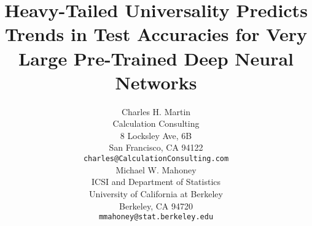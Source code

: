 \documentclass{article}
\title{Heavy-Tailed Universality Predicts Trends in Test Accuracies for Very Large Pre-Trained Deep Neural Networks}
\author{%
  Charles H. Martin \\
  Calculation Consulting \\
  8 Locksley Ave, 6B \\
  San Francisco, CA 94122 \\
  \texttt{charles@CalculationConsulting.com} \\
  \And
  Michael W. Mahoney \\
  ICSI and Department of Statistics \\
  University of California at Berkeley \\
  Berkeley, CA 94720 \\
  \texttt{mmahoney@stat.berkeley.edu} \\
}
\begin{document}
\maketitle








%

{\small
%
%

}

\appendix

\end{document}
